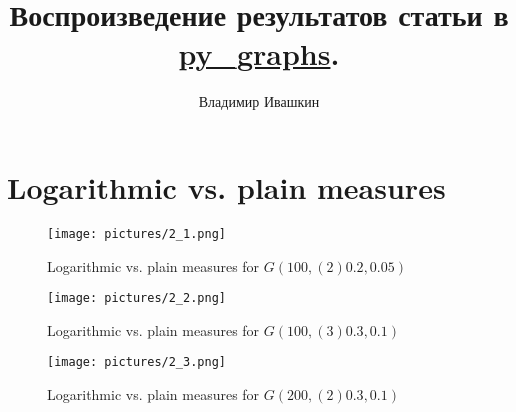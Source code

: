 \documentclass{article}
\title{
        Воспроизведение результатов статьи в \href{https://github.com/illusionww/py_graphs}{py\_graphs}.
}
\author{Владимир Ивашкин}
\begin{document}
\maketitle

\setcounter{chapter}{2}


\section{Logarithmic vs. plain measures}
\begin{figure}[H]
	\texttt{[image: pictures/2\_1.png]}
	\caption{\label{f_vs1}Logarithmic vs. plain measures for $G(100, (2)0.2, 0.05)$}
\end{figure}

\begin{figure}[H]
	\texttt{[image: pictures/2\_2.png]}
	\caption{\label{f_vs2}Logarithmic vs. plain measures for $G(100, (3)0.3, 0.1)$}
\end{figure}

\begin{figure}[H]
	\texttt{[image: pictures/2\_3.png]}
	\caption{\label{f_vs3}Logarithmic vs. plain measures for $G(200, (2)0.3, 0.1)$}
\end{figure}
\nopagebreak


\newpage
\end{document}
